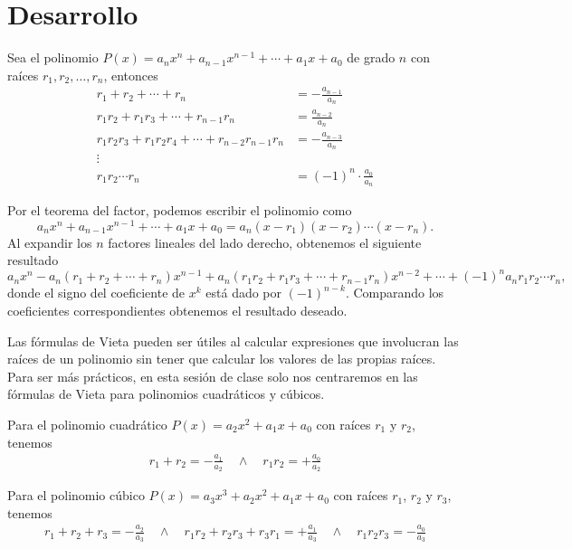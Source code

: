 \section{Desarrollo}

\begin{definition}
    Sea el polinomio $P(x) = a_n x^n + a_{n - 1} x^{n - 1} + \cdots  + a_1 x + a_0$ de grado $n$ con raíces $r_1, r_2, \ldots, r_n$,
    entonces
    \begin{align*}
        r_1 + r_2 + \cdots + r_n &= - \frac{a_{n - 1}}{a_n}\\
        r_1 r_2 + r_1 r_3 + \cdots + r_{n - 1} r_n &= \frac{a_{n - 2}}{a_n}\\
        r_1 r_2 r_3 + r_1 r_2 r_4 + \cdots + r_{n - 2} r_{n - 1} r_n &= -\frac{a_{n - 3}}{a_n}\\
        \vdots\\
        r_1 r_2 \cdots r_n &= (-1)^n \cdot \frac{a_0}{a_n}
    \end{align*}
\end{definition}

Por el teorema del factor, podemos escribir el polinomio como
\[
    a_n x^n + a_{n - 1} x^{n - 1} + \cdots  + a_1 x + a_0 = a_n (x - r_1)(x - r_2) \cdots (x - r_n).
\]
Al expandir los $n$ factores lineales del lado derecho, obtenemos el siguiente resultado
\[
    a_n x^n - a_n(r_1 + r_2 + \cdots + r_n)x^{n - 1} + a_n(r_1 r_2 + r_1 r_3 + \cdots + r_{n - 1} r_n)x^{n - 2} + \cdots + (-1)^n a_n r_1 r_2 \cdots r_n,
\]
donde el signo del coeficiente de $x^k$ está dado por $(-1)^{n - k}$.
Comparando los coeficientes correspondientes obtenemos el resultado deseado.

Las fórmulas de Vieta pueden ser útiles al calcular expresiones que involucran las raíces de un polinomio sin tener que calcular los valores de las propias raíces.
Para ser más prácticos, en esta sesión de clase solo nos centraremos en las fórmulas de Vieta para polinomios cuadráticos y cúbicos.

\begin{remark.tcb}
        Para el polinomio cuadrático $P(x) = a_2 x^2 + a_1 x + a_0$ con raíces $r_1$ y $r_2$, tenemos
        \begin{align*}
            r_1 + r_2 = - \frac{a_1}{a_2} \quad \land \quad
            r_1 r_2 = +\frac{a_0}{a_2}
        \end{align*}
\end{remark.tcb}
\begin{remark.tcb}
    Para el polinomio cúbico $P(x) = a_3 x^3 + a_2 x^2 + a_1 x + a_0$ con raíces $r_1$, $r_2$ y $r_3$, tenemos
    \begin{align*}
        r_1 + r_2 + r_3 = - \frac{a_2}{a_3} \quad \land \quad
        r_1 r_2 + r_2 r_3 + r_3 r_1 = +\frac{a_1}{a_3} \quad \land \quad
        r_1 r_2 r_3 = - \frac{a_0}{a_3}
    \end{align*}
\end{remark.tcb}

